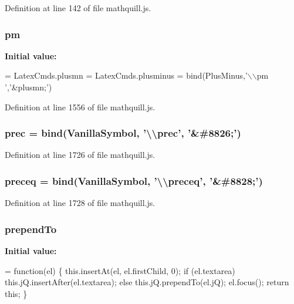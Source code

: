 Definition at line 142 of file mathquill.\-js.

\subsubsection[{pm}]{ pm}\label{mathquill_8js_a614f9d372dc6203f2794178fea8f8c92}
{\bfseries Initial value\-:}
\begin{DoxyCode}
= LatexCmds.plusmn = LatexCmds.plusminus =
  bind(PlusMinus,\textcolor{stringliteral}{'\(\backslash\)\(\backslash\)pm '},\textcolor{stringliteral}{'&plusmn;'})
\end{DoxyCode}


Definition at line 1556 of file mathquill.\-js.

\subsubsection[{prec}]{ prec = {\bf bind}({\bf Vanilla\-Symbol}, '\textbackslash{}\textbackslash{}prec', '\&\#8826;')}\label{mathquill_8js_ae9d09731f15116f81c9a49886546787e}


Definition at line 1726 of file mathquill.\-js.

\subsubsection[{preceq}]{ preceq = {\bf bind}({\bf Vanilla\-Symbol}, '\textbackslash{}\textbackslash{}preceq', '\&\#8828;')}\label{mathquill_8js_af2ede4f988cbfbac4a9077def7f505f6}


Definition at line 1728 of file mathquill.\-js.

\subsubsection[{prepend\-To}]{\setlength{\rightskip}{0pt plus 5cm}{\bf \-\_\-} prepend\-To}\label{mathquill_8js_a7235edf9c569f688aa181e4e4c9d85b9}
{\bfseries Initial value\-:}
\begin{DoxyCode}
= \textcolor{keyword}{function}(el) \{
  this.insertAt(el, el.firstChild, 0);
  \textcolor{keywordflow}{if} (el.textarea) 
    this.jQ.insertAfter(el.textarea);
  \textcolor{keywordflow}{else}
    this.jQ.prependTo(el.jQ);
  el.focus();
  \textcolor{keywordflow}{return} \textcolor{keyword}{this};
\}
\end{DoxyCode}


